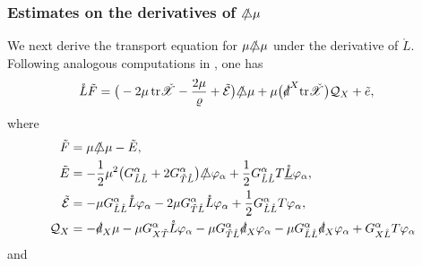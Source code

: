 \documentclass[11pt,twoside]{article}
\def\al{\alpha}
\def\f{\frac}
\begin{document}
\subsubsection{Estimates on the derivatives of $\slashed\triangle\mu$}\label{Sformu}
We next derive the transport equation for $\mu\slashed{\triangle}\mu$ under the derivative of $\mathring{L}$.
Following analogous computations in \cite[Section 4.2]{Ding4}, one has
\begin{equation*}
\begin{split}
\mathring{L}\tilde{F} &= \big(-2\mu\,\mathrm{tr}\check{\mathscr{X}} - \frac{2\mu}{\varrho} + \tilde{\mathcal{E}}\big)\slashed{\triangle}\mu+ \mu\bigl(\slashed{d}^X\mathrm{tr}\check{\mathscr{X}}\bigr)\mathcal{Q}_X + \tilde{e},
\end{split}
\end{equation*}
where
\begin{equation}\label{EEF}
\begin{split}
\tilde{F} &= \mu\slashed{\triangle}\mu - \tilde{E}, \\
\tilde{E} &= -\frac{1}{2}\mu^2 \bigl(G_{\mathring{L}\mathring{L}}^\al + 2G_{\tilde{T}\mathring{L}}^\al\bigr)\slashed{\triangle}\varphi_\al
+ \frac{1}{2}G_{\mathring{L}\mathring{L}}^\al T\underline{\mathring{L}}\varphi_\al, \\
\tilde{\mathcal{E}} &= -\mu G^\al_{\mathring{L}\mathring{L}}\mathring{L}\varphi_\al
- 2\mu G^\al_{\tilde{T}\mathring{L}}\mathring{L}\varphi_\al
+\f12 G_{\mathring{L}\mathring{L}}^\al T\varphi_\al, \\
\mathcal{Q}_X &= -\slashed{d}_X\mu
- \mu G^\al_{X\tilde{T}}\mathring{L}\varphi_\al
- \mu G^{\al}_{\tilde{T}\mathring{L}}\slashed{d}_X\varphi_\al
- \mu G^\al_{\mathring{L}\mathring{L}}\slashed{d}_X\varphi_\al
+ G^\al_{X\mathring{L}}T\varphi_\al
\end{split}
\end{equation}
and
\end{document}

